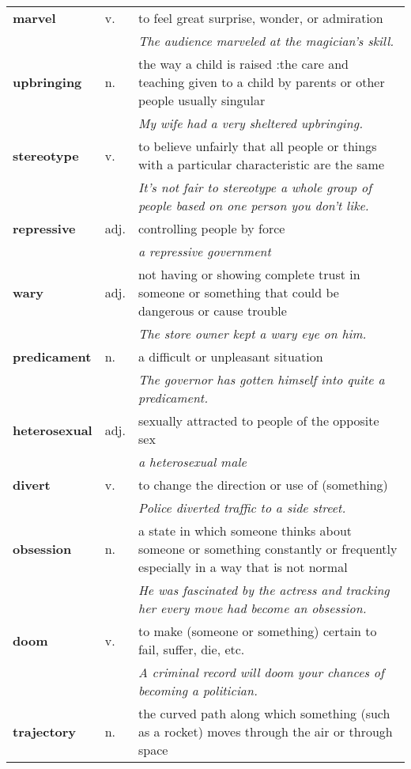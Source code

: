 \documentclass[a4paper]{article}
\begin{document}
\begin{longtable}{llp{11cm}}
\textbf{marvel} & v. &  to feel great surprise, wonder, or admiration \\
 & & \textit{The audience marveled at the magician's skill.}\\[0.08cm]
\textbf{upbringing} & n. &  the way a child is raised :the care and teaching given to a child by parents or other people usually singular \\
 & & \textit{My wife had a very sheltered upbringing.}\\[0.08cm]
\textbf{stereotype} & v. &  to believe unfairly that all people or things with a particular characteristic are the same \\
 & & \textit{It's not fair to stereotype a whole group of people based on one person you don't like.}\\[0.08cm]
\textbf{repressive} & adj. &  controlling people by force \\
 & & \textit{a repressive government}\\[0.08cm]
\textbf{wary} & adj. &  not having or showing complete trust in someone or something that could be dangerous or cause trouble \\
 & & \textit{The store owner kept a wary eye on him.}\\[0.08cm]
\textbf{predicament} & n. &  a difficult or unpleasant situation \\
 & & \textit{The governor has gotten himself into quite a predicament.}\\[0.08cm]
\textbf{heterosexual} & adj. &  sexually attracted to people of the opposite sex \\
 & & \textit{a heterosexual male}\\[0.08cm]
\textbf{divert} & v. &  to change the direction or use of (something) \\
 & & \textit{Police diverted traffic to a side street.}\\[0.08cm]
\textbf{obsession} & n. &  a state in which someone thinks about someone or something constantly or frequently especially in a way that is not normal \\
 & & \textit{He was fascinated by the actress and tracking her every move had become an obsession.}\\[0.08cm]
\textbf{doom} & v. &  to make (someone or something) certain to fail, suffer, die, etc. \\
 & & \textit{A criminal record will doom your chances of becoming a politician.}\\[0.08cm]
\textbf{trajectory} & n. &  the curved path along which something (such as a rocket) moves through the air or through space \\

\end{longtable}
\end{document}
